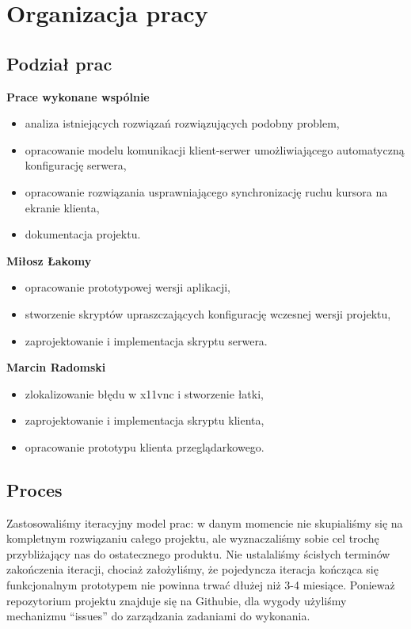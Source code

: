   \vfill

\section{Organizacja pracy}

  \subsection{Podział prac}

    \textbf{Prace wykonane wspólnie}
    \begin{itemize}[noitemsep]
      \item analiza istniejących rozwiązań rozwiązujących podobny problem,
      \item opracowanie modelu komunikacji klient-serwer umożliwiającego automatyczną konfigurację serwera,
      \item opracowanie rozwiązania usprawniającego synchronizację ruchu kursora na ekranie klienta,
      \item dokumentacja projektu.
    \end{itemize}

    \noindent
    \textbf{Miłosz Łakomy}
    \begin{itemize}[noitemsep]
      \item opracowanie prototypowej wersji aplikacji,
      \item stworzenie skryptów upraszczających konfigurację wczesnej wersji projektu,
      \item zaprojektowanie i implementacja skryptu serwera.
    \end{itemize}

    \noindent
    \textbf{Marcin Radomski}
    \begin{itemize}[noitemsep]
      \item zlokalizowanie błędu w x11vnc i stworzenie łatki,
      \item zaprojektowanie i implementacja skryptu klienta,
      \item opracowanie prototypu klienta przeglądarkowego.
    \end{itemize}

  \subsection{Proces}

    Zastosowaliśmy iteracyjny model prac: w danym momencie nie skupialiśmy się na kompletnym rozwiązaniu całego projektu, ale wyznaczaliśmy sobie cel trochę przybliżający nas do ostatecznego produktu. Nie ustalaliśmy ścisłych terminów zakończenia iteracji, chociaż założyliśmy, że pojedyncza iteracja kończąca się funkcjonalnym prototypem nie powinna trwać dłużej niż 3-4 miesiące. Ponieważ repozytorium projektu znajduje się na Githubie, dla wygody użyliśmy mechanizmu ``issues'' do zarządzania zadaniami do wykonania.

